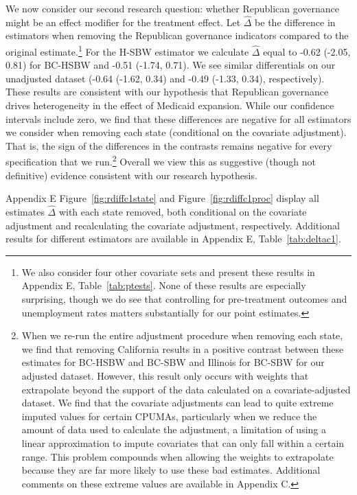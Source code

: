 \documentclass[aoas]{imsart}
\theoremstyle{plain}
\theoremstyle{remark}
\begin{document}
We now consider our second research question: whether Republican governance might be an effect modifier for the treatment effect. Let $\hat{\Delta}$ be the difference in estimators when removing the Republican governance indicators compared to the original estimate.\footnote{We also consider four other covariate sets and present these results in Appendix E, Table~\ref{tab:ptests}. None of these results are especially surprising, though we do see that controlling for pre-treatment outcomes and unemployment rates matters substantially for our point estimates.} For the H-SBW estimator we calculate $\hat{\Delta}$ equal to -0.62 (-2.05, 0.81) for BC-HSBW and -0.51 (-1.74, 0.71). We see similar differentials on our unadjusted dataset (-0.64 (-1.62, 0.34) and -0.49 (-1.33, 0.34), respectively). These results are consistent with our hypothesis that Republican governance drives heterogeneity in the effect of Medicaid expansion. While our confidence intervals include zero, we find that these differences are negative for all estimators we consider when removing each state (conditional on the covariate adjustment). That is, the sign of the differences in the contrasts remains negative for every specification that we run.\footnote{When we re-run the entire adjustment procedure when removing each state, we find that removing California results in a positive contrast between these estimates for BC-HSBW and BC-SBW and Illinois for BC-SBW for our adjusted dataset. However, this result only occurs with weights that extrapolate beyond the support of the data calculated on a covariate-adjusted dataset. We find that the covariate adjustments can lead to quite extreme imputed values for certain CPUMAs, particularly when we reduce the amount of data used to calculate the adjustment, a limitation of using a linear approximation to impute covariates that can only fall within a certain range. This problem compounds when allowing the weights to extrapolate because they are far more likely to use these bad estimates. Additional comments on these extreme values are available in Appendix C.} Overall we view this as suggestive (though not definitive) evidence consistent with our research hypothesis.

Appendix E Figure~\ref{fig:rdiffc1state} and Figure~\ref{fig:rdiffc1proc} display all estimates $\hat{\Delta}$ with each state removed, both conditional on the covariate adjustment and recalculating the covariate adjustment, respectively. Additional results for different estimators are available in Appendix E, Table~\ref{tab:deltac1}.
\end{document}
